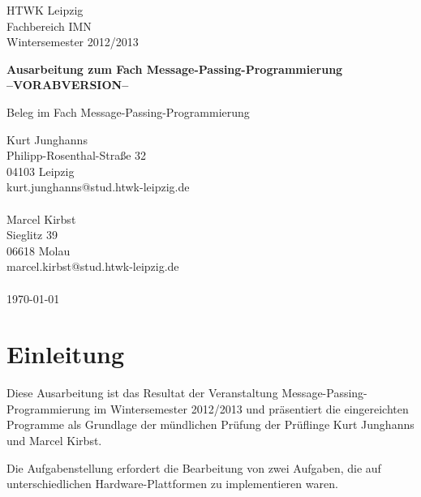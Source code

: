 \documentclass[a4paper,12pt]{scrartcl}
\begin{document}
\begin{titlepage}
\begin{small}
\vfill {HTWK Leipzig\\ 
Fachbereich IMN \\ 
Wintersemester 2012/2013}
\end{small}


\begin{center}
\begin{Large}
\vfill {\textsf{\textbf{
Ausarbeitung zum Fach Message-Passing-Programmierung\\--VORABVERSION--\\
}}}
\end{Large}
Beleg im Fach Message-Passing-Programmierung
\end{center}

\begin{small}
\vfill
Kurt Junghanns\\Philipp-Rosenthal-Stra\ss{}e 32\\04103 Leipzig\\kurt.junghanns@stud.htwk-leipzig.de\\
\\Marcel Kirbst\\Sieglitz 39\\06618 Molau\\marcel.kirbst@stud.htwk-leipzig.de\\ \\
\today
\end{small}

\end{titlepage}


\tableofcontents
\thispagestyle{empty}

\clearpage

\onehalfspacing

\pagestyle{plain}


\section{Einleitung}
Diese Ausarbeitung ist das Resultat der Veranstaltung Message-Passing-Programmierung im Wintersemester 2012/2013 und pr\"asentiert die eingereichten Programme
als Grundlage der m\"undlichen Pr\"ufung der Pr\"uflinge Kurt Junghanns und Marcel Kirbst.

Die Aufgabenstellung erfordert die Bearbeitung von zwei Aufgaben, die auf unterschiedlichen Hardware-Plattformen zu implementieren waren.
\end{document}
